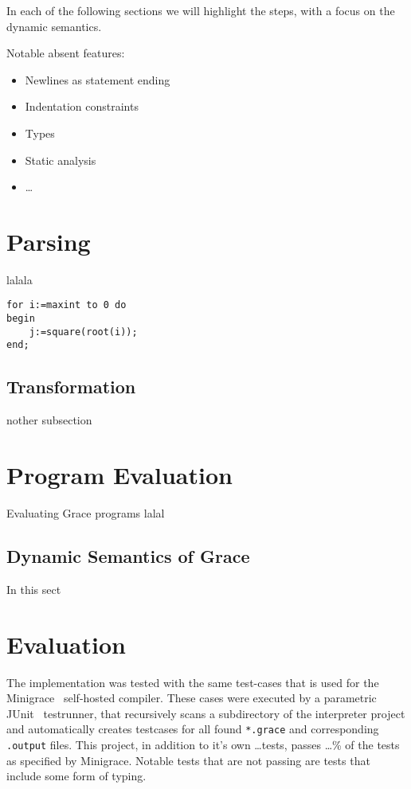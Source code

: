 \documentclass[a4paper,UKenglish]{lipics-v2016}
\begin{document}
In each of the following sections we will highlight the steps, with a focus on the dynamic semantics.

Notable absent features:
\begin{itemize}
	\item Newlines as statement ending
	\item Indentation constraints
	\item Types
	\item Static analysis
	\item \dots
\end{itemize}

\section{Parsing}
lalala

\begin{lstlisting}[caption={Useless code},label=list:8-6,captionpos=t,float,abovecaptionskip=-\medskipamount]
for i:=maxint to 0 do 
begin 
    j:=square(root(i));
end;
\end{lstlisting}

\subsection{Transformation}
nother subsection

\section{Program Evaluation}
Evaluating Grace programs lalal

\subsection{Dynamic Semantics of Grace}
In this sect

\section{Evaluation}
The implementation was tested with the same test-cases that is used for the Minigrace~\cite{minigrace} self-hosted compiler. These cases were executed by a parametric JUnit~\cite{junit} testrunner, that recursively scans a subdirectory of the interpreter project and automatically creates testcases for all found \verb!*.grace! and corresponding \verb!.output! files. This project, in addition to it's own \dots tests, passes \dots \% of the tests as specified by Minigrace. Notable tests that are not passing are tests that include some form of typing.
\end{document}
